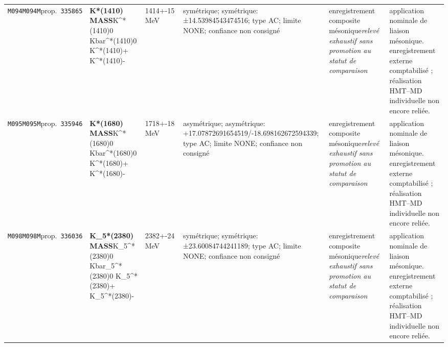 \begin{landscape}
\begin{longtable}{L{1.85cm}L{4.45cm}L{2.35cm}L{4.05cm}L{3.35cm}L{7.15cm}}
\texttt{M094}\newline \texttt{M094M}\newline prop.\ \texttt{335865} & \textbf{K*(1410) MASS}\newline K\textasciicircum{}*(1410)0 \textbar{}\allowbreak{} Kbar\textasciicircum{}*(1410)0 \textbar{}\allowbreak{} K\textasciicircum{}*(1410)+ \textbar{}\allowbreak{} K\textasciicircum{}*(1410)- & 1414+-15\,MeV & symétrique; symétrique: ±14.53984543474516; type AC; limite NONE; confiance non consigné & enregistrement composite mésonique\newline \emph{relevé exhaustif sans promotion au statut de comparaison} & application nominale de liaison mésonique. enregistrement externe comptabilisé ; réalisation HMT--MD individuelle non encore reliée. \\
\texttt{M095}\newline \texttt{M095M}\newline prop.\ \texttt{335946} & \textbf{K*(1680) MASS}\newline K\textasciicircum{}*(1680)0 \textbar{}\allowbreak{} Kbar\textasciicircum{}*(1680)0 \textbar{}\allowbreak{} K\textasciicircum{}*(1680)+ \textbar{}\allowbreak{} K\textasciicircum{}*(1680)- & 1718+-18\,MeV & asymétrique; asymétrique: +17.07872691654519/-18.698162672594339; type AC; limite NONE; confiance non consigné & enregistrement composite mésonique\newline \emph{relevé exhaustif sans promotion au statut de comparaison} & application nominale de liaison mésonique. enregistrement externe comptabilisé ; réalisation HMT--MD individuelle non encore reliée. \\
\texttt{M098}\newline \texttt{M098M}\newline prop.\ \texttt{336036} & \textbf{K\_\allowbreak{}5*(2380) MASS}\newline K\_\allowbreak{}5\textasciicircum{}*(2380)0 \textbar{}\allowbreak{} Kbar\_\allowbreak{}5\textasciicircum{}*(2380)0 \textbar{}\allowbreak{} K\_\allowbreak{}5\textasciicircum{}*(2380)+ \textbar{}\allowbreak{} K\_\allowbreak{}5\textasciicircum{}*(2380)- & 2382+-24\,MeV & symétrique; symétrique: ±23.60084744241189; type AC; limite NONE; confiance non consigné & enregistrement composite mésonique\newline \emph{relevé exhaustif sans promotion au statut de comparaison} & application nominale de liaison mésonique. enregistrement externe comptabilisé ; réalisation HMT--MD individuelle non encore reliée. \\

\end{longtable}
\end{landscape}
